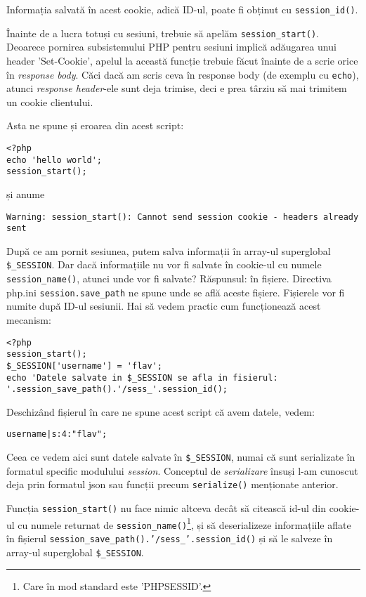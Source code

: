 Informația salvată \^in acest cookie, adică ID-ul, poate fi obținut cu
\texttt{session\_id()}.

\^Inainte de a lucra totuși cu sesiuni, trebuie să apelăm \texttt{session\_start()}.
Deoarece pornirea subsistemului PHP pentru sesiuni implică adăugarea unui header
'Set-Cookie', apelul la această funcție trebuie făcut \^inainte de a scrie orice
\^in \textit{response body}. Căci dacă am scris ceva \^in response body (de exemplu
cu \texttt{echo}), atunci \textit{response header}-ele sunt deja trimise, deci
e prea târziu să mai trimitem un cookie clientului.

Asta ne spune și eroarea din acest script:
\begin{lstlisting}[title=Headers already sent]
<?php
echo 'hello world';
session_start();
\end{lstlisting}
și anume
\begin{verbatim}
Warning: session_start(): Cannot send session cookie - headers already sent
\end{verbatim} 

După ce am pornit sesiunea, putem salva informații \^in array-ul superglobal
\texttt{\$\_SESSION}. Dar dacă informațiile nu vor fi salvate \^in cookie-ul
cu numele \texttt{session\_name()}, atunci unde vor fi salvate? Răspunsul:
\^in fișiere. Directiva php.ini \texttt{session.save\_path} ne spune unde se află
aceste fișiere. Fișierele vor fi numite după ID-ul sesiunii. Hai să vedem practic
cum funcționează acest mecanism:
\begin{lstlisting}[title=Understanding Sessions]
<?php
session_start();
$_SESSION['username'] = 'flav';
echo 'Datele salvate in $_SESSION se afla in fisierul: '.session_save_path().'/sess_'.session_id();
\end{lstlisting}

Deschiz\^and fișierul \^in care ne spune acest script că avem datele, vedem:
\begin{verbatim}
username|s:4:"flav";
\end{verbatim}
Ceea ce vedem aici sunt datele salvate \^in \texttt{\$\_SESSION}, numai că
sunt serializate \^in formatul specific modulului \textit{session}. Conceptul
de \textsl{serializare} \^insuși l-am cunoscut deja prin formatul json sau funcții
precum \texttt{serialize()} menționate anterior.

Funcția \texttt{session\_start()} nu face nimic altceva dec\^at să citească id-ul
din cookie-ul cu numele returnat de \texttt{session\_name()}\footnote{Care \^in mod
standard este 'PHPSESSID'.}, și să deserializeze informațiile aflate \^in fișierul
\texttt{session\_save\_path().'/sess\_'.session\_id()}
și să le salveze \^in
array-ul superglobal \texttt{\$\_SESSION}.

